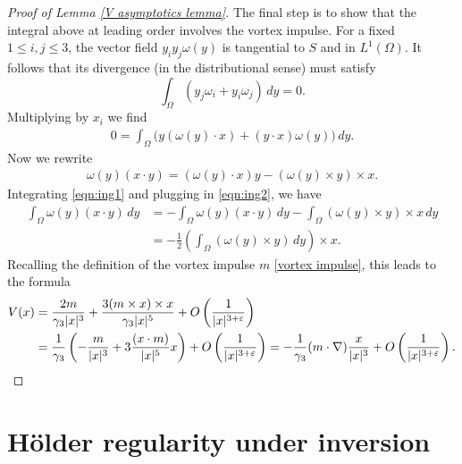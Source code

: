 \documentclass[11pt,reqno]{amsart}
\theoremstyle{plain}
\theoremstyle{remark}
\numberwithin{equation}{section}
\begin{document}
\begin{proof}[Proof of Lemma \ref{V asymptotics lemma}]
The final step is to show that the integral above at leading order involves the vortex impulse.  
For a fixed $1 \leq i, j \leq 3$, the vector field $y_i y_j \omega(y)$ is tangential to $S$ and in $L^1(\Omega)$.  It follows that its divergence (in the distributional sense) must satisfy 
\[
\int_{\Omega} (y_j\omega_i + y_i\omega_j) \, dy = 0.
\]
Multiplying by $x_i$ we find
\begin{align}
  \label{eqn:ing2}
  0 = \int_\Omega \Big(y(\omega(y) \cdot x) + (y\cdot x) \omega(y)
  \Big)\, dy.
\end{align}
Now we rewrite
\begin{align}
  \label{eqn:ing1}
  \omega(y) (x\cdot y) = (\omega(y) \cdot x)y - (\omega(y) \times y) \times
  x.
\end{align}
Integrating \eqref{eqn:ing1} and plugging in \eqref{eqn:ing2}, we have
\begin{align*}
  \int_\Omega \omega(y) (x\cdot y)\, dy &  = -\int_\Omega \omega(y) (x\cdot y)\, dy - \int_\Omega (\omega(y)
  \times y) \times x\, dy \\
  & = - \frac 12 \left(
  \int_\Omega (\omega(y) \times y)\, dy \right) \times x.
\end{align*}
Recalling the definition of the vortex impulse $m$ \eqref{vortex impulse}, this leads to the formula
\begin{align*}
V(x) & = {2m\over \gamma_3 |x|^3} + {3(m\times x)\times x \over \gamma_3 |x|^5} + O\left( {1\over |x|^{3+\varepsilon}} \right)\\
& = {1\over \gamma_3}\left( -{m\over |x|^3} + 3{(x\cdot m) \over |x|^5} x \right) + O\left( {1\over |x|^{3+\varepsilon}} \right) = -{1\over \gamma_3} (m\cdot \nabla) {x\over |x|^3} + O\left( {1\over |x|^{3+\varepsilon}} \right).  \qedhere
\end{align*}
\end{proof}

\section{H\"older regularity under inversion} \label{inversion appendix}
\end{document}

